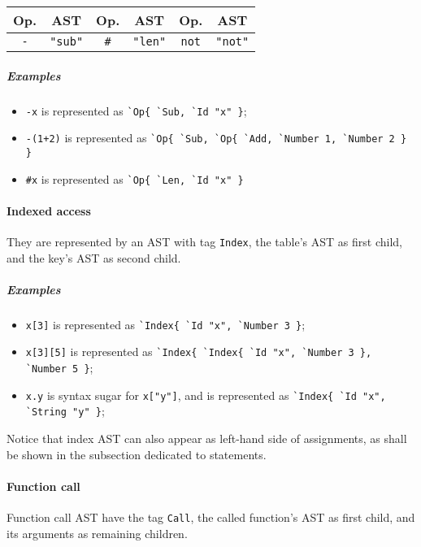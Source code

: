 \begin{center}
\begin{tabular}{|c|c||c|c||c|c|}
  \hline
  \bf Op. & \bf AST & 
  \bf Op. & \bf AST & 
  \bf Op. & \bf AST \\
  
  \hline\hline %
  \verb+-+   & \verb+"sub"+ & 
  \verb+#+   & \verb+"len"+ & 
  \verb+not+ & \verb+"not"+ \\
  \hline %
\end{tabular}
\end{center}

\subparagraph{Examples}
\begin{itemize}
\item \verb|-x| is represented as \verb|`Op{ `Sub, `Id "x" }|;
\item \verb|-(1+2)| is represented as
  \verb|`Op{ `Sub, `Op{ `Add, `Number 1, `Number 2 } }|
\item \verb|#x| is represented as
  \verb|`Op{ `Len, `Id "x" }|
\end{itemize}

\paragraph{Indexed access}
They are represented by an AST with tag \verb+Index+, the table's AST
as first child, and the key's AST as second child.

\subparagraph{Examples}
\begin{itemize}
\item \verb+x[3]+ is represented as \verb+`Index{ `Id "x", `Number 3 }+;
\item \verb+x[3][5]+ is represented as
  \verb+`Index{ `Index{ `Id "x", `Number 3 }, `Number 5 }+;
\item \verb+x.y+ is syntax sugar for \verb+x["y"]+, and is represented as
  \verb+`Index{ `Id "x", `String "y" }+;
\end{itemize}

Notice that index AST can also appear as left-hand side of
assignments, as shall be shown in the subsection dedicated to
statements.

\paragraph{Function call}
Function call AST have the tag \verb+Call+, the called function's AST
as first child, and its arguments as remaining children.

